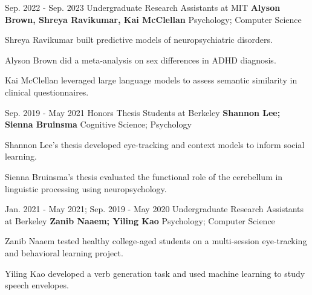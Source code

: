 

\begin{cventries}

  \cventry
    {Sep. 2022 - Sep. 2023} %
    {Undergraduate Research Assistants at MIT} %
    {\textbf{Alyson Brown, Shreya Ravikumar, Kai McClellan}} 
    {Psychology; Computer Science} %
    {
      \begin{cvitems} %
        \item {Shreya Ravikumar built predictive models of neuropsychiatric disorders.}
        \item {Alyson Brown did a meta-analysis on sex differences in ADHD diagnosis.}
        \item {Kai McClellan leveraged large language models to assess semantic similarity in clinical questionnaires.}
      \end{cvitems}
    }
    

 
  \cventry
    {Sep. 2019 - May 2021} %
    {Honors Thesis Students at Berkeley} %
    {\textbf{Shannon Lee; Sienna Bruinsma}} 
    {Cognitive Science; Psychology} %
    {
      \begin{cvitems} %
        \item {Shannon Lee's thesis developed eye-tracking and context models to inform social learning.}
        \item {Sienna Bruinsma's thesis evaluated the functional role of the cerebellum in linguistic processing using neuropsychology.}
      \end{cvitems}
    }
    
    
  \cventry
    {Jan. 2021 - May 2021; Sep. 2019 - May 2020} %
    {Undergraduate Research Assistants at Berkeley} %
   	{\textbf{Zanib Naaem; Yiling Kao}}
   	{Psychology; Computer Science}
    {
      \begin{cvitems} %
        \item {Zanib Naaem tested healthy college-aged students on a multi-session eye-tracking and behavioral learning project.}
        \item {Yiling Kao developed a verb generation task and used machine learning to study speech envelopes.}
      \end{cvitems}
    }
    

\end{cventries}
